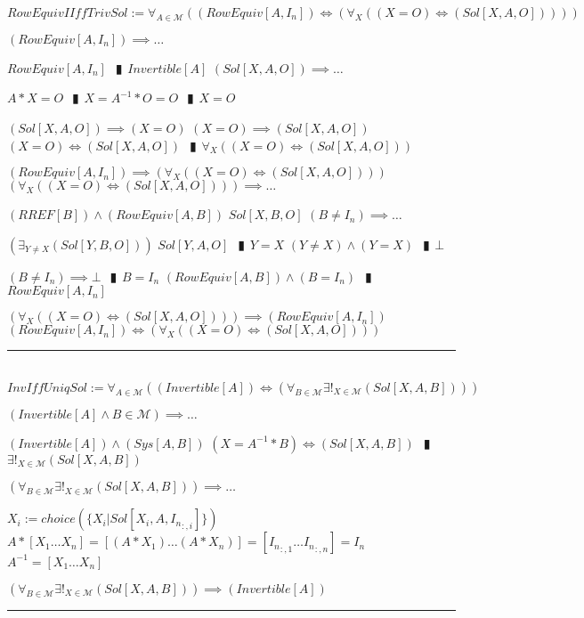 \documentclass{book}
\newcommand{\abr}{:=}
\newcommand{\pipe}{$\phantom{(}\vrectangleblack\phantom{)}$}
\newcommand{\pr}[1]{\left(#1\right)}
\begin{document}
$RowEquivIIffTrivSol \abr \forall_{A \in \mathcal{M}}\pr{(RowEquiv[A, I_n]) \iff \pr{\forall_{X}\pr{(X = O) \iff (Sol[X, A, O])}}}$
\begin{enumerate}
  \lit $(RowEquiv[A, I_n]) \implies \ldots$
  \begin{enumerate}
    \lit $RowEquiv[A, I_n]$ \pipe $Invertible[A]$
    \lit $(Sol[X, A, O]) \implies \ldots$
    \begin{enumerate}
      \lit $A * X = O$ \pipe $X = A^{-1} * O = O$ \pipe $X = O$
    \end{enumerate}
    \lit $(Sol[X, A, O]) \implies (X = O)$
    \lit $(X = O) \implies (Sol[X, A, O])$
    \lit $(X = O) \iff (Sol[X, A, O])$ \pipe $\forall_{X}\pr{(X = O) \iff (Sol[X, A, O])}$
  \end{enumerate}
  \lit $(RowEquiv[A, I_n]) \implies \pr{\forall_{X}\pr{(X = O) \iff (Sol[X, A, O])}}$
  \lit $\pr{\forall_{X}\pr{(X = O) \iff (Sol[X, A, O])}} \implies \ldots$
  \begin{enumerate}
    \lit $(RREF[B]) \land (RowEquiv[A, B])$
    \lit $Sol[X, B, O]$
    \lit $(B \neq I_n) \implies \ldots$
    \begin{enumerate}
      \lit $\pr{\exists_{Y \neq X}(Sol[Y, B, O])}$
      \lit $Sol[Y, A, O]$ \pipe $Y = X$
      \lit $(Y \neq X) \land (Y = X)$ \pipe $\bot$
    \end{enumerate}
    \lit $(B \neq I_n) \implies \bot$ \pipe $B = I_n$
    \lit $(RowEquiv[A, B]) \land (B = I_n)$ \pipe $RowEquiv[A, I_n]$
  \end{enumerate}
  \lit $\pr{\forall_{X}\pr{(X = O) \iff (Sol[X, A, O])}} \implies (RowEquiv[A, I_n])$
  \lit $(RowEquiv[A, I_n]) \iff \pr{\forall_{X}\pr{(X = O) \iff (Sol[X, A, O])}}$
\end{enumerate} \vspace{.75mm} \hrule \vspace{.75mm} \ \\ 

$InvIffUniqSol \abr \forall_{A \in \mathcal{M}}\pr{(Invertible[A]) \iff \pr{\forall_{B \in \mathcal{M}} \exists!_{X \in \mathcal{M}}(Sol[X, A, B])}}$
\begin{enumerate}
  \lit $(Invertible[A] \land B \in \mathcal{M}) \implies \ldots$
  \begin{enumerate}
    \lit $(Invertible[A]) \land (Sys[A, B])$
    \lit $(X = A^{-1} * B) \iff (Sol[X, A, B])$ \pipe $\exists!_{X \in \mathcal{M}}(Sol[X, A, B])$
  \end{enumerate}
  \lit $\pr{\forall_{B \in \mathcal{M}} \exists!_{X \in \mathcal{M}}(Sol[X, A, B])} \implies \ldots$
  \begin{enumerate}
    \lit $X_i \abr choice(\{X_i | Sol[X_i, A, {I_n}_{:, i}]\})$
    \lit $A * [X_1 \ldots X_n] = [(A * X_1) \ldots (A * X_n)] =  [{I_n}_{:, 1} \ldots {I_n}_{:, n}] = I_n$ \lit $A^{-1} = [X_1 \ldots X_n]$
  \end{enumerate}
  \lit $\pr{\forall_{B \in \mathcal{M}} \exists!_{X \in \mathcal{M}}(Sol[X, A, B])} \implies (Invertible[A])$
\end{enumerate} \vspace{.75mm} \hrule \vspace{.75mm} \ \\ 
\end{document}

